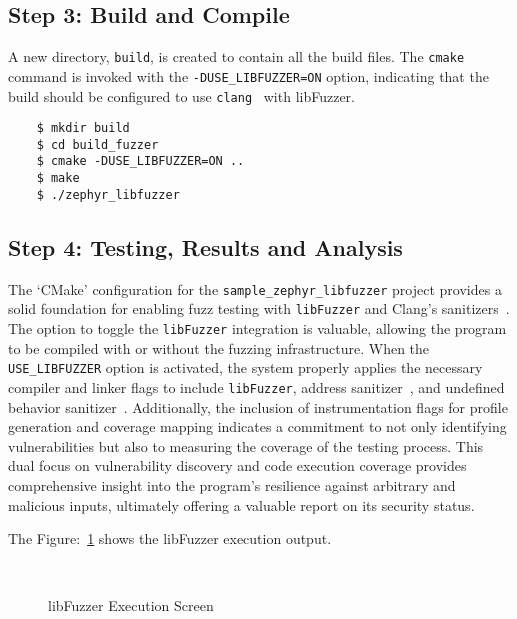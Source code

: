 \subsection*{Step 3: Build and Compile}
A new directory, \texttt{build}, is created to contain all the build files.
The \texttt{cmake} command is invoked with the \texttt{-DUSE\_LIBFUZZER=ON} option,
indicating that the build should be configured to
use \texttt{clang}~\cite{ClangCLa81:online} with libFuzzer.

\begin{verbatim}
    $ mkdir build
    $ cd build_fuzzer
    $ cmake -DUSE_LIBFUZZER=ON ..
    $ make
    $ ./zephyr_libfuzzer
\end{verbatim}

\subsection*{Step 4: Testing, Results and Analysis}
The `CMake' configuration for the \texttt{sample\_zephyr\_libfuzzer} project
provides a solid foundation for enabling fuzz testing with \texttt{libFuzzer}
and Clang's sanitizers~\cite{GitHubgo55:online}. The option to toggle the
\texttt{libFuzzer} integration is valuable, allowing the program to be compiled
with or without the fuzzing infrastructure. When the \texttt{USE\_LIBFUZZER}
option is activated, the system properly applies the necessary compiler and
linker flags to include \texttt{libFuzzer},
address sanitizer~\cite{GitHubgo55:online}, and
undefined behavior sanitizer~\cite{GitHubgo55:online}. Additionally,
the inclusion of instrumentation flags for profile generation and coverage
mapping indicates a commitment to not only identifying vulnerabilities but also
to measuring the coverage of the testing process. This dual focus on
vulnerability discovery and code execution coverage provides comprehensive
insight into the program's resilience against arbitrary and malicious inputs,
ultimately offering a valuable report on its security status.


The Figure:~\ref{fig:lib_fuzzer} shows the libFuzzer execution output.
\begin{figure}[H]
    \centering
    {}
    \caption{libFuzzer Execution Screen}~\label{fig:lib_fuzzer}
\end{figure}

